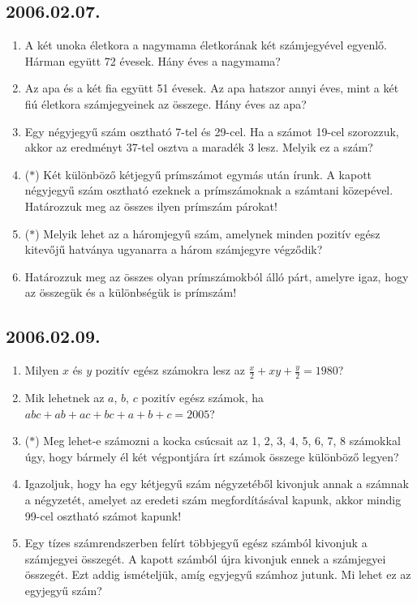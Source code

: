 \subsection*{2006.02.07.}
\begin{enumerate}
\item A két unoka életkora a nagymama életkorának két számjegyével egyenlő. Hárman együtt 72 évesek. Hány éves a nagymama?
\item Az apa és a két fia együtt 51 évesek. Az apa hatszor annyi éves, mint a két fiú életkora számjegyeinek az összege. Hány éves az apa?
\item Egy négyjegyű szám osztható 7-tel és 29-cel.
Ha a számot 19-cel szorozzuk, akkor az eredményt 37-tel osztva a maradék 3 lesz. Melyik ez a szám?
\item ($*$) Két különböző kétjegyű prímszámot egymás után írunk. A kapott négyjegyű szám osztható ezeknek a prímszámoknak a számtani közepével. Határozzuk meg az összes ilyen prímszám párokat!
\item ($*$) Melyik lehet az a háromjegyű szám, amelynek minden pozitív egész kitevőjű hatványa ugyanarra a három számjegyre végződik?
\item Határozzuk meg az összes olyan prímszámokból álló párt, amelyre igaz, hogy az összegük és a különbségük is prímszám!
\end{enumerate}

\subsection*{2006.02.09.}
\begin{enumerate}
\item Milyen $x$ és $y$ pozitív egész számokra lesz az $\frac{x}{2}+xy+\frac{y}{2}=1980$?

\item Mik lehetnek az $a$, $b$, $c$ pozitív egész számok, ha $abc+ab+ac+bc+a+b+c=2005$?

\item ($*$) Meg lehet-e számozni a kocka csúcsait az 1, 2, 3, 4, 5, 6, 7, 8 számokkal úgy, hogy bármely él két végpontjára írt számok összege különböző legyen?

\item Igazoljuk, hogy ha egy kétjegyű szám négyzetéből kivonjuk annak a számnak a négyzetét, amelyet az eredeti szám megfordításával kapunk, akkor mindig 99-cel osztható számot kapunk!

\item Egy tízes számrendszerben felírt többjegyű egész számból kivonjuk a számjegyei összegét. A kapott számból újra kivonjuk ennek a számjegyei összegét. Ezt addig ismételjük, amíg egyjegyű számhoz jutunk. Mi lehet ez az egyjegyű szám?

 
\end{enumerate}

